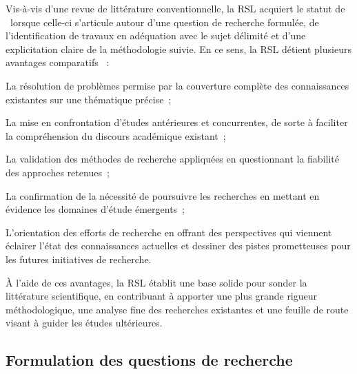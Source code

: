 \begin{refsegment}
Vis-à-vis d'une revue de littérature conventionnelle, la \acrshort{RSL} acquiert le statut de ~lorsque celle-ci s'articule autour d'une question de recherche formulée, de l'identification de travaux en adéquation avec le sujet délimité et d'une explicitation claire de la méthodologie suivie. En ce sens, la \acrshort{RSL} détient plusieurs avantages comparatifs \textcolor{blue}{\autocite[2]{transportation_research_board_of_the_national_academies_literature_2015}}~:
    \begin{customitemize}
        \item La résolution de problèmes permise par la couverture complète des connaissances existantes sur une thématique précise~;
        \item La mise en confrontation d'études antérieures et concurrentes, de sorte à faciliter la compréhension du discours académique existant~;
        \item La validation des méthodes de recherche appliquées en questionnant la fiabilité des approches retenues~;
        \item La confirmation de la nécessité de poursuivre les recherches en mettant en évidence les domaines d'étude émergents~;
        \item L'orientation des efforts de recherche en offrant des perspectives qui viennent éclairer l'état des connaissances actuelles et dessiner des pistes prometteuses pour les futures initiatives de recherche.
    \end{customitemize}
À l'aide de ces avantages, la \acrshort{RSL} établit une base solide pour sonder la littérature scientifique, en contribuant à apporter une plus grande rigueur méthodologique, une analyse fine des recherches existantes et une feuille de route visant à guider les études ultérieures.%

\subsection{Formulation des questions de recherche
    \label{chap2:formulation-questions-recherche}
    }
    

\end{refsegment}
